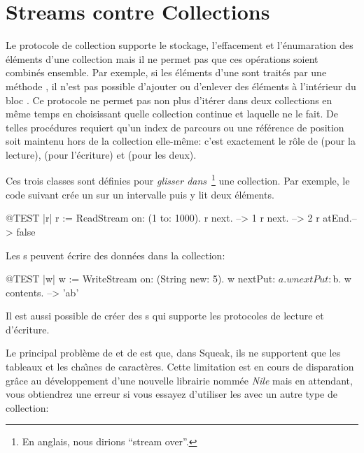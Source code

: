 \documentclass[a4paper,10pt,twoside]{book}
\begin{document}
\section{Streams contre Collections}

Le protocole de collection supporte le stockage, l'effacement et l'\'enumaration
des \'el\'ements d'une collection mais il ne permet pas que ces op\'erations
soient combin\'es ensemble. Par exemple, si les \'el\'ements d'une 
 sont trait\'es par une m\'ethode , il n'est pas possible d'ajouter ou d'enlever des \'el\'ements
\`a l'int\'erieur du bloc .
Ce protocole ne permet pas non plus d'it\'erer dans deux collections
en m\^eme temps en choisissant quelle collection continue
et laquelle ne le fait.
De telles proc\'edures requiert qu'un index de parcours ou une r\'ef\'erence
de position soit maintenu hors de la collection elle-m\^eme:
c'est exactement le r\^ole de  
 (pour la lecture),  (pour l'\'ecriture) et  (pour les deux).

Ces trois classes sont d\'efinies pour \emph{glisser dans}~\footnote{En anglais, nous dirions ``stream over''.} une collection.
Par exemple, le code suivant cr\'ee un \stream sur un intervalle puis y lit deux \'el\'ements.
\begin{code}{@TEST |r|}
r := ReadStream on: (1 to: 1000).
r next.   --> 1
r next.   --> 2
r atEnd.--> false
\end{code}

Les s peuvent \'ecrire des donn\'ees dans la collection:
\begin{code}{@TEST |w|}
w := WriteStream on: (String new: 5).
w nextPut: $a.
w nextPut: $b.
w contents. -->  'ab'
\end{code}

Il est aussi possible de cr\'eer des s qui supporte
les protocoles de lecture et d'\'ecriture.

Le principal probl\`eme de  et de 
est que, dans Squeak, ils ne supportent que les tableaux et les 
cha\^{\i}nes de caract\`eres. Cette limitation est en cours de
disparation gr\^ace au d\'eveloppement d'une nouvelle librairie
nomm\'ee \emph{Nile} mais en attendant, vous obtiendrez une erreur
si vous essayez d'utiliser les \streams avec un autre type de collection:
\end{document}
